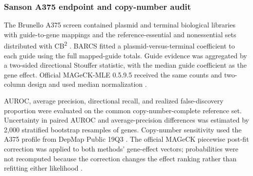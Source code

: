 \subsubsection{Sanson A375 endpoint and copy-number audit}

The Brunello A375 screen contained plasmid and terminal biological libraries
with guide-to-gene mappings and the reference-essential and nonessential sets
distributed with CB\textsuperscript{2} \citep{sanson2018optimized,
hart2017evaluation}.  BARCS fitted a plasmid-versus-terminal coefficient to
each guide using the full mapped-guide totals.  Guide evidence was aggregated
by a two-sided directional Stouffer statistic, with the median guide
coefficient as the gene effect.  Official MAGeCK-MLE 0.5.9.5 received the same
counts and two-column design and used median normalization
\citep{li2014mageck}.

AUROC, average precision, directional recall, and realized false-discovery
proportion were evaluated on the common copy-number-complete reference set.
Uncertainty in paired AUROC and average-precision differences was estimated by
2,000 stratified bootstrap resamples of genes.  Copy-number sensitivity used
the A375 profile from DepMap Public 19Q3 \citep{depmap19q3}.  The official
MAGeCK piecewise post-fit correction was applied to both methods' gene-effect
vectors; probabilities were not recomputed because the correction changes the
effect ranking rather than refitting either likelihood
\citep{meyers2017cnv}.
